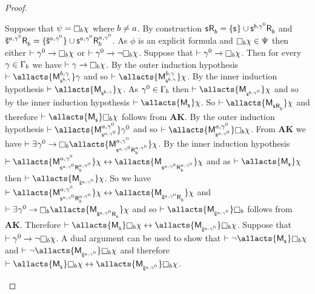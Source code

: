 \begin{proof}
\begin{enumerate}
        Suppose that $\psi = \necessaryB \chi$ where $b \neq a$. 
        By construction $\aStateS \aAccessibility{\agentB} = \{\aStateS\} \cup \aStateS[\agentB,\gamma^0] \aAccessibility{\agentB}$ and $\aPStateS[\agentA,\gamma^0] \aAccessibility{\agentB} = \{\aPStateS[\agentA,\gamma^0]\} \cup \aStateS[\agentA,\gamma^0] \aAccessibility[\agentA,\gamma^0]{\agentB}$.
        As $\phi$ is an explicit formula and $\necessaryB \chi \in \Psi$ then either $\proves \gamma^0 \implies \necessaryB \chi$ or $\proves \gamma^0 \implies \neg \necessaryB \chi$.
        Suppose that $\proves \gamma^0 \implies \necessaryB \chi$.
        Then for every $\gamma \in \Gamma_b$ we have $\proves \gamma \implies \necessaryB \chi$.
        By the outer induction hypothesis $\proves \allacts{\aPModel[\agentB,\gamma]{\aStateS[\agentB,\gamma]}} \gamma$ and so $\proves \allacts{\aPModel[\agentB,\gamma]{\aStateS[\agentB,\gamma]}} \chi$.
        By the inner induction hypothesis $\proves \allacts{\aPModel{\aStateS[\agentB,\gamma]}} \chi$.
        As $\gamma^0 \in \Gamma_b$ then $\proves \allacts{\aPModel{\aStateS[\agentB,\gamma^0]}} \chi$ and so by the inner induction hypothesis $\proves \allacts{\aPModel{\aStateS}} \chi$.
        So $\proves \allacts{\aPModel{\aStateS \aAccessibility{\agentB}}} \chi$ and therefore $\proves \allacts{\aPModel{\aStateS}} \necessaryB \chi$ follows from {\bf AK}.
        By the outer induction hypothesis $\proves \allacts{\aPModel[\agentA,\gamma^0]{\aStateS[\agentA,\gamma^0]}} \gamma^0$ and so $\proves \allacts{\aPModel[\agentA,\gamma^0]{\aStateS[\agentA,\gamma^0]}} \necessaryB \chi$.
        From {\bf AK} we have $\proves \somerefs{\gamma^0} \implies \necessaryB \allacts{\aPModel[\agentA,\gamma^0]{\aStateS[\agentA,\gamma^0] \aAccessibility[\agentA,\gamma^0]{\agentB}}} \chi$.
        By the inner induction hypothesis $\proves \allacts{\aPModel[\agentA,\gamma^0]{\aStateS[\agentA,\gamma^0] \aAccessibility[\agentA,\gamma^0]{\agentB}}} \chi \iff \allacts{\aPModel{\aStateS[\agentA,\gamma^0] \aAccessibility[\agentA,\gamma^0]{\agentB}}} \chi$ and as $\proves \allacts{\aPModel{\aStateS}} \chi$ then $\proves \allacts{\aPModel{\aPStateS[\agentA,\gamma^0]}} \chi$.
        So we have $\proves \allacts{\aPModel[\agentA,\gamma^0]{\aStateS[\agentA,\gamma^0] \aAccessibility[\agentA,\gamma^0]{\agentB}}} \chi \iff \allacts{\aPModel{\aPStateS[\agentA,\gamma^0] \aAccessibility{\agentB}}} \chi$ and $\proves \somerefs{\gamma^0} \implies \necessaryB \allacts{\aPModel{\aPStateS[\agentA,\gamma^0] \aAccessibility{\agentB}}} \chi$ and so $\proves \allacts{\aPModel{\aPStateS[\agentA,\gamma^0]}} \necessaryB$ follows from {\bf AK}.
        Therefore $\proves \allacts{\aPModel{\aStateS}} \necessaryB \chi \iff \allacts{\aPModel{\aPStateS[\agentA,\gamma^0]}} \necessaryB \chi$.
        Suppose that $\proves \gamma^0 \implies \neg \necessaryB \chi$.
        A dual argument can be used to show that $\proves \neg \allacts{\aPModel{\aStateS}} \necessaryB \chi$ and $\proves \neg \allacts{\aPModel{\aPStateS[\agentA,\gamma^0]}} \necessaryB \chi$ and therefore $\proves \allacts{\aPModel{\aStateS}} \necessaryB \chi \iff \allacts{\aPModel{\aPStateS[\agentA,\gamma^0]}} \necessaryB \chi$.


\end{enumerate}
\end{proof}
